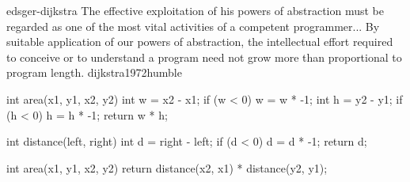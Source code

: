 \documentclass{article}
\begin{document}

\lnQuote
  {edsger-dijkstra}
  {The effective exploitation of his powers of abstraction must be regarded as one of the most vital activities of a competent programmer... By suitable application of our powers of abstraction, the intellectual effort required to conceive or to understand a program need not grow more than proportional to program length.}
  {dijkstra1972humble}

\begin{lnSnippet}
int area(x1, y1, x2, y2) {
  int w = x2 - x1;
  if (w < 0) { w = w * -1; }
  int h = y2 - y1;
  if (h < 0) { h = h * -1; }
  return w * h;
}
\end{lnSnippet}
\begin{lnSnippet}
int distance(left, right) {
  int d = right - left;
  if (d < 0) { d = d * -1; }
  return d;
}

int area(x1, y1, x2, y2) {
  return distance(x2, x1)
    * distance(y2, y1);
}
\end{lnSnippet}
\end{document}

